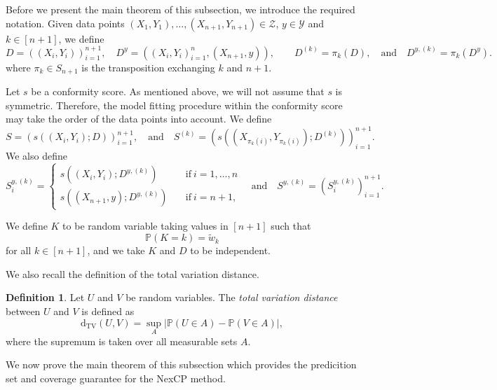 \documentclass[11pt, titlepage]{article} %
\newcommand{\R}{\mathrm}
\newcommand{\Prob}[1]{\mathbb{P}\left( #1 \right)}
\numberwithin{equation}{section}
\theoremstyle{definition}
\newtheorem{definition}{Definition}
\numberwithin{theorem}{section}
\numberwithin{lemma}{section}
\numberwithin{corollary}{section}
\numberwithin{proposition}{section}
\numberwithin{definition}{section}
\numberwithin{remark}{section}
\begin{document}
\noindent
Before we present the main theorem of this subsection, we introduce the required notation. Given data points \((X_1, Y_1), \ldots, (X_{n+1}, Y_{n+1}) \in \mathcal{Z}\), \(y \in \mathcal{Y}\) and \(k \in [n+1]\), we define \[D = ((X_i, Y_i))_{i=1}^{n+1}, \quad D^{y} = ((X_i, Y_i)_{i=1}^n, (X_{n+1}, y)), \quad \quad D^{(k)} = \pi_k(D), \quad \mathrm{and} \quad D^{y, (k)} = \pi_k(D^{y}). \] where \(\pi_k \in S_{n+1}\) is the transposition exchanging \(k\) and \(n+1\). \vskip5pt

\noindent
Let \(s\) be a conformity score. As mentioned above, we will not assume that \(s\) is symmetric. Therefore, the model fitting procedure within the conformity score may take the order of the data points into account. We define \[S = (s((X_i, Y_i); D))_{i=1}^{n+1}, \quad \mathrm{and} \quad S^{(k)} = ( s(( X_{\pi_k(i)}, Y_{\pi_k(i)} ); D^{(k)}) )_{i=1}^{n+1}.\] We also define \[S_i^{y, (k)} = \begin{cases}
    s(( X_i, Y_i ); D^{y, (k)}) \quad &\mathrm{if} \ i = 1, \ldots, n \\
    s(( X_{n+1}, y ); D^{y, (k)}) \quad &\mathrm{if} \ i = n+1,
\end{cases} \quad \mathrm{and} \quad S^{y, (k)} = (S_i^{y,(k)})_{i=1}^{n+1}.\]

\noindent
We define \(K\) to be random variable taking values in \([n+1]\) such that \begin{equation}
    \Prob{K = k} = \tilde{w}_k
\label{eqn:nexCP_K_defn}
\end{equation} for all \(k \in [n+1]\), and we take \(K\) and \(D\) to be independent. \vskip5pt

\noindent
We also recall the definition of the total variation distance.

\begin{definition}
    Let \(U\) and \(V\) be random variables. The \textit{total variation distance} between \(U\) and \(V\) is defined as \[\R{d_{TV}}(U,V) = \sup_{A} | \Prob{U \in A} - \Prob{V \in A}|, \] where the supremum is taken over all measurable sets \(A\). 
\label{defn:TV_distance}
\end{definition}

\noindent
We now prove the main theorem of this subsection which provides the predicition set and coverage guarantee for the NexCP method.
\end{document}
